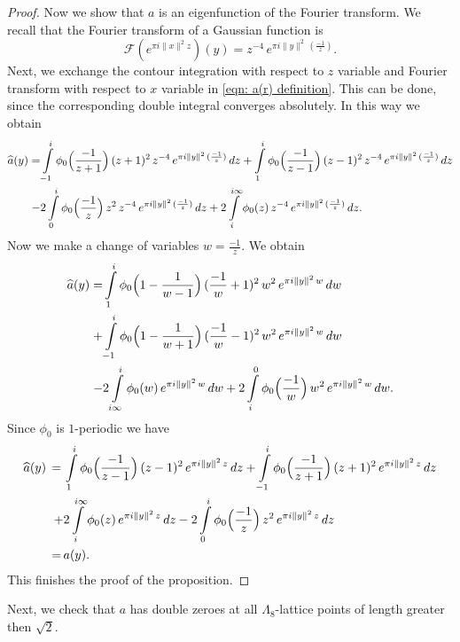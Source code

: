 \begin{proof}
Now we show that $a$ is an eigenfunction of the Fourier transform. We recall that the Fourier transform of a Gaussian function is
\begin{equation}\label{eqn-gaussian Fourier}\mathcal{F}(e^{\pi i  \|x\|^2 z})(y)=z^{-4}\,e^{\pi i \|y\|^2 \,(\frac{-1}{z}) }.\end{equation}
Next, we exchange the contour integration with respect to $z$ variable and Fourier transform  with respect to $x$ variable in \eqref{eqn: a(r) definition}. This can be done, since the corresponding double integral converges absolutely. In this way we obtain
\begin{align}
  \widehat{a}(y)=&\int\limits_{-1}^i\phi_0\Big(\frac{-1}{z+1}\Big)\,(z+1)^2\,z^{-4}\,e^{\pi i \|y\|^2 \,(\frac{-1}{z})}\,dz
  +\int\limits_{1}^i\phi_0\Big(\frac{-1}{z-1}\Big)\,(z-1)^2\,z^{-4}\,e^{\pi i \|y\|^2 \,(\frac{-1}{z})}\,dz\notag \\
  -&2\int\limits_{0}^i\phi_0\Big(\frac{-1}{z}\Big)\,z^2\,z^{-4}\,e^{\pi i \|y\|^2 \,(\frac{-1}{z})}\,dz +2\int\limits_{i}^{i\infty}\phi_0(z)\,z^{-4}\,e^{\pi i \|y\|^2 \,(\frac{-1}{z})}\,dz.\notag
\end{align}
Now we make a change of variables $w=\frac{-1}{z}$. We obtain
\begin{align}
  \widehat{a}(y)=&\int\limits_{1}^i\phi_0\Big(1-\frac{1}{w-1}\Big)\,(\frac{-1}{w}+1)^2\,w^{2}\,e^{\pi i \|y\|^2 \,w}\,dw\notag\\
  +&\int\limits_{-1}^i\phi_0\Big(1-\frac{1}{w+1}\Big)\,(\frac{-1}{w}-1)^2\,w^2\,e^{\pi i \|y\|^2 \,w}\,dw\\
  -&2\int\limits_{i \infty}^i\phi_0(w)\,e^{\pi i \|y\|^2 \,w}\,dw +2\int\limits_{i}^{0}\phi_0\Big(\frac{-1}{w}\Big)\,w^{2}\,e^{\pi i \|y\|^2 \,w}\,dw.\notag
\end{align}
Since $\phi_0$ is $1$-periodic we have
\begin{align}
  \widehat{a}(y)\,=\,&\int\limits_{1}^i\phi_0\Big(\frac{-1}{z-1}\Big)\,(z-1)^2\,e^{\pi i \|y\|^2 \,z}\,dz
  +\int\limits_{-1}^i\phi_0\Big(\frac{-1}{z+1}\Big)\,(z+1)^2\,e^{\pi i \|y\|^2 \,z}\,dz\notag \\
  +&2\int\limits_{i}^{i\infty}\phi_0(z)\,e^{\pi i \|y\|^2 \,z}\,dz
  -2\int\limits_{0}^{i}\phi_0\Big(\frac{-1}{z}\Big)\,z^{2}\,e^{\pi i \|y\|^2 \,z}\,dz\notag \\
  \,=\,&a(y).
\end{align}
This finishes the proof of the proposition.
\end{proof}

Next, we check that $a$ has double zeroes at all $\Lambda_8$-lattice points of length greater then $\sqrt{2}$.


